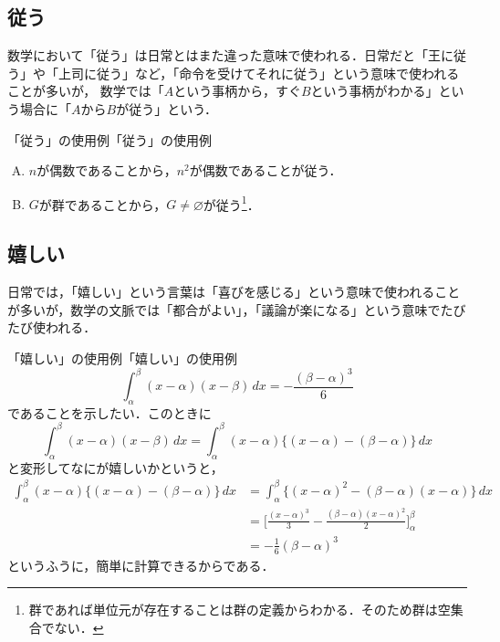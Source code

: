 \subsection{従う}

数学において「従う」は日常とはまた違った意味で使われる．日常だと「王に従う」や「上司に従う」など，「命令を受けてそれに従う」という意味で使われることが多いが，
数学では「$A$という事柄から，すぐ$B$という事柄がわかる」という場合に「$A$から$B$が従う」という．

\begin{example}{「従う」の使用例}{「従う」の使用例}
  \begin{enumerate}[(A)]
    \item $n$が偶数であることから，$n^2$が偶数であることが従う．\label{enu:偶数ならば偶数}
    \item $G$が群であることから，$G \ne \varnothing$が従う\footnote{群であれば単位元が存在することは群の定義からわかる．そのため群は空集合でない．}．\label{enu:群の例}
  \end{enumerate}
\end{example}

\subsection{嬉しい}

日常では，「嬉しい」という言葉は「喜びを感じる」という意味で使われることが多いが，数学の文脈では「都合がよい」，「議論が楽になる」という意味でたびたび使われる．

\begin{example}{「嬉しい」の使用例}{「嬉しい」の使用例}
  \[
    \int_{\alpha}^{\beta} (x-\alpha)(x-\beta)\, dx = -\frac{(\beta-\alpha)^3}{6}
  \]
  であることを示したい．このときに
  \[
    \int_{\alpha}^{\beta} (x-\alpha)(x-\beta)\, dx = \int_{\alpha}^{\beta}  (x-\alpha)\{(x-\alpha) - (\beta-\alpha)\} \, dx
  \]
  と変形してなにが嬉しいかというと，
  \begin{align*}
    \int_{\alpha}^{\beta}  (x-\alpha)\{(x-\alpha) - (\beta-\alpha)\} \, dx & = \int_{\alpha}^{\beta} \{  (x-\alpha)^2 -(\beta-\alpha)(x-\alpha) \} \, dx                        \\
                                                                           & = \Biggl [ \frac{(x-\alpha)^3}{3} - \frac{(\beta-\alpha)(x-\alpha)^2}{2} \Biggr ]_{\alpha}^{\beta} \\
                                                                           & = - \frac{1}{6} (\beta-\alpha)^3
  \end{align*}
  というふうに，簡単に計算できるからである．
\end{example}



